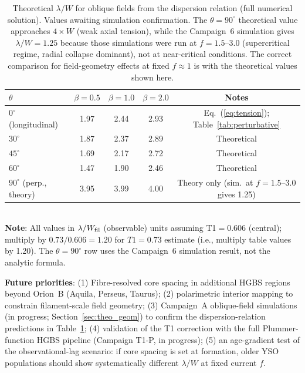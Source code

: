 \documentclass[twoside,twocolumn]{mnras}
\begin{document}
\begin{table}
\caption{Theoretical $\lambda/W$ for oblique fields from the \citet{Nakamura1993} dispersion relation (full numerical solution). Values awaiting simulation confirmation. The $\theta=90^\circ$ theoretical value approaches $4\times W$ (weak axial tension), while the Campaign~6 simulation gives $\lambda/W=1.25$ because those simulations were run at $f=1.5$--$3.0$ (supercritical regime, radial collapse dominant), not at near-critical conditions. The correct comparison for field-geometry effects at fixed $f\approx 1$ is with the theoretical values shown here.}
\label{tab:oblique_theory}
\small
\begin{tabular}{lcccc}
\toprule
$\theta$ & $\beta=0.5$ & $\beta=1.0$ & $\beta=2.0$ & Notes \\
\midrule
$0^\circ$ (longitudinal) & 1.97 & 2.44 & 2.93 & Eq.~(\ref{eq:tension}); Table~\ref{tab:perturbative} \\
$30^\circ$ & 1.87 & 2.37 & 2.89 & Theoretical \\
$45^\circ$ & 1.69 & 2.17 & 2.72 & Theoretical \\
$60^\circ$ & 1.47 & 1.90 & 2.46 & Theoretical \\
$90^\circ$ (perp., theory) & 3.95 & 3.99 & 4.00 & Theory only (sim.\ at $f=1.5$--$3.0$ gives 1.25) \\
\bottomrule
\end{tabular}
\\ \footnotesize \textbf{Note}: All values in $\lambda/W_{\rm fil}$ (observable) units assuming T1$=0.606$ (central); multiply by $0.73/0.606 = 1.20$ for $T1=0.73$ estimate (i.e., multiply table values by 1.20). The $\theta=90^\circ$ row uses the Campaign~6 simulation result, not the analytic formula.
\end{table}

\textbf{Future priorities}: (1) Fibre-resolved core spacing in additional HGBS regions beyond Orion~B (Aquila, Perseus, Taurus); (2) polarimetric interior mapping to constrain filament-scale field geometry; (3) Campaign~A oblique-field simulations (in progress; Section~\ref{sec:theo_geom}) to confirm the \citet{Nakamura1993} dispersion-relation predictions in Table~\ref{tab:oblique_theory}; (4) validation of the T1 correction with the full Plummer-function HGBS pipeline (Campaign T1-P, in progress); (5) an age-gradient test of the observational-lag scenario: if core spacing is set at formation, older YSO populations should show systematically different $\lambda/W$ at fixed current $f$.
\end{document}
